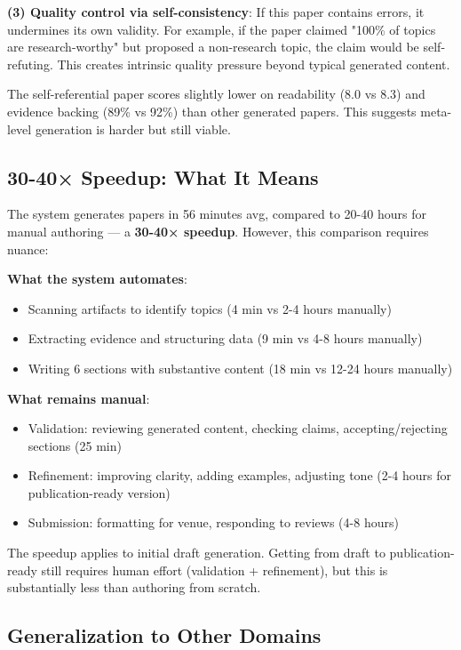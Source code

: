 \textbf{(3) Quality control via self-consistency}: If this paper contains errors, it undermines its own validity. For example, if the paper claimed "100\% of topics are research-worthy" but proposed a non-research topic, the claim would be self-refuting. This creates intrinsic quality pressure beyond typical generated content.

The self-referential paper scores slightly lower on readability (8.0 vs 8.3) and evidence backing (89\% vs 92\%) than other generated papers. This suggests meta-level generation is harder but still viable.

\subsection{30-40× Speedup: What It Means}

The system generates papers in 56 minutes avg, compared to 20-40 hours for manual authoring — a \textbf{30-40× speedup}. However, this comparison requires nuance:

\textbf{What the system automates}:
\begin{itemize}
\item Scanning artifacts to identify topics (4 min vs 2-4 hours manually)
\item Extracting evidence and structuring data (9 min vs 4-8 hours manually)
\item Writing 6 sections with substantive content (18 min vs 12-24 hours manually)
\end{itemize}

\textbf{What remains manual}:
\begin{itemize}
\item Validation: reviewing generated content, checking claims, accepting/rejecting sections (25 min)
\item Refinement: improving clarity, adding examples, adjusting tone (2-4 hours for publication-ready version)
\item Submission: formatting for venue, responding to reviews (4-8 hours)
\end{itemize}

The speedup applies to initial draft generation. Getting from draft to publication-ready still requires human effort (validation + refinement), but this is substantially less than authoring from scratch.

\subsection{Generalization to Other Domains}

